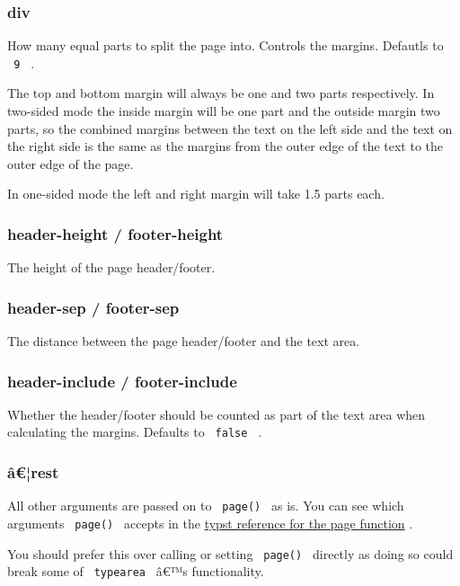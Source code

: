 \subsubsection{div}\label{div}

How many equal parts to split the page into. Controls the margins.
Defautls to \texttt{\ 9\ } .

The top and bottom margin will always be one and two parts respectively.
In two-sided mode the inside margin will be one part and the outside
margin two parts, so the combined margins between the text on the left
side and the text on the right side is the same as the margins from the
outer edge of the text to the outer edge of the page.

In one-sided mode the left and right margin will take 1.5 parts each.

\subsubsection{header-height /
footer-height}\label{header-height-footer-height}

The height of the page header/footer.

\subsubsection{header-sep / footer-sep}\label{header-sep-footer-sep}

The distance between the page header/footer and the text area.

\subsubsection{header-include /
footer-include}\label{header-include-footer-include}

Whether the header/footer should be counted as part of the text area
when calculating the margins. Defaults to \texttt{\ false\ } .

\subsubsection{â€¦rest}\label{uxe2rest}

All other arguments are passed on to \texttt{\ page()\ } as is. You can
see which arguments \texttt{\ page()\ } accepts in the
\href{https://typst.app/docs/reference/layout/page/}{typst reference for
the page function} .

You should prefer this over calling or setting \texttt{\ page()\ }
directly as doing so could break some of \texttt{\ typearea\ } â€™s
functionality.

